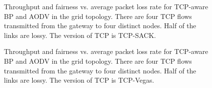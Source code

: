 \documentclass[conference]{IEEEtran}
\begin{document}
\begin{figure}[t!]
\vspace{-0pt}
\begin{center}
\end{center}
\begin{center}
\vspace{-5pt}
\caption{\label{fig:grid_thrpt_vs_loss_sack} \scriptsize Throughput and fairness vs. average packet loss rate for TCP-aware BP and AODV in the grid topology. There are four TCP flows transmitted from the gateway to four distinct nodes. Half of the links are lossy. The version of TCP is TCP-SACK.
}
\end{center}
\vspace{-15pt}
\end{figure}


\begin{figure}[t!]
\vspace{-0pt}
\begin{center}
\end{center}
\begin{center}
\vspace{-5pt}
\caption{\label{fig:grid_thrpt_vs_loss_vegas} \scriptsize Throughput and fairness vs. average packet loss rate for TCP-aware BP and AODV in the grid topology. There are four TCP flows transmitted from the gateway to four distinct nodes. Half of the links are lossy. The version of TCP is TCP-Vegas.}
\end{center}
\vspace{-15pt}
\end{figure}
\end{document}

